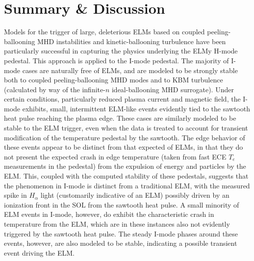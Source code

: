
\section{Summary \& Discussion}\label{sec:imode_mod_conclusions}

Models for the trigger of large, deleterious ELMs based on coupled peeling-ballooning MHD instabilities \cite{Wilson2002,Snyder2003,Snyder2004,Wilson2006} and kinetic-ballooning turbulence \cite{Snyder1999,Candy2005,Snyder2001} have been particularly successful in capturing the physics underlying the ELMy H-mode pedestal.  This approach is applied to the I-mode pedestal.  The majority of I-mode cases are naturally free of ELMs, and are modeled to be strongly stable both to coupled peeling-ballooning MHD modes and to KBM turbulence (calculated by way of the infinite-$n$ ideal-ballooning MHD surrogate).  Under certain conditions, particularly reduced plasma current and magnetic field, the I-mode exhibits, small, intermittent ELM-like events evidently tied to the sawtooth heat pulse reaching the plasma edge.  These cases are similarly modeled to be stable to the ELM trigger, even when the data is treated to account for transient modification of the temperature pedestal by the sawtooth.  The edge behavior of these events appear to be distinct from that expected of ELMs, in that they do not present the expected crash in edge temperature (taken from fast ECE $T_e$ measurements in the pedestal) from the expulsion of energy and particles by the ELM.  This, coupled with the computed stability of these pedestals, suggests that the phenomenon in I-mode is distinct from a traditional ELM, with the measured spike in $H_\alpha$ light (customarily indicative of an ELM) possibly driven by an ionization front in the SOL from the sawtooth heat pulse.  A small minority of ELM events in I-mode, however, do exhibit the characteristic crash in temperature from the ELM, which are in these instances also not evidently triggered by the sawtooth heat pulse.  The steady I-mode phases around these events, however, are also modeled to be stable, indicating a possible transient event driving the ELM.

